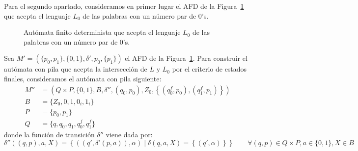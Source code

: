 \documentclass[12pt]{article}
\begin{document}
\begin{ejercicio}[2.5 puntos]
        Para el segundo apartado, consideramos en primer lugar el AFD de la Figura~\ref{fig:AFD} que acepta el lenguaje $L_0$ de las palabras con un número par de $0$'s.
        \begin{figure}[h]
            \centering
            \caption{\centering Autómata finito determinista que acepta el lenguaje $L_0$ de las palabras con un número par de $0$'s.}
            \label{fig:AFD}
        \end{figure}

        Sea $M'=(\{p_0,p_1\},\{0,1\},\delta',p_0,\{p_1\})$ el AFD de la Figura~\ref{fig:AFD}. Para construir el autómata con pila que acepta la intersección de $L$ y $L_0$ por el criterio de estados finales, consideramos el autómata con pila siguiente:
        \begin{align*}
            M''&=\left(Q\times P,\{0,1\},B,\delta'',(q_0,p_0),Z_0,\left\{\left(q_0^f,p_0\right),\left(q_1^f,p_1\right)\right\}\right) \\
            B&=\{Z_0,0,1,0_i,1_i\} \\
            P&=\{p_0,p_1\} \\
            Q&=\{q,q_0,q_1,q_0^f,q_1^f\}
        \end{align*}
        donde la función de transición $\delta''$ viene dada por:
        \begin{equation*}
            \delta''((q,p),a,X)=\left\{\left((q',\delta'(p,a)),\alpha\right) \mid \delta(q,a,X)=\left\{(q',\alpha)\right\}\right\} \qquad \forall (q,p)\in Q\times P,a\in \{0,1\},X\in B
        \end{equation*}
    \end{ejercicio}
\end{document}
